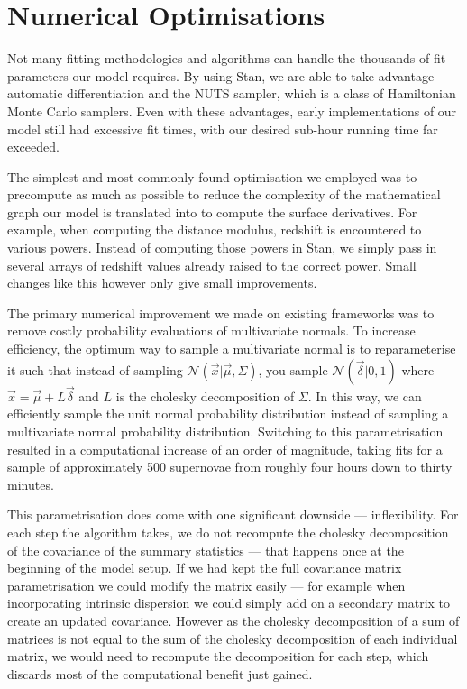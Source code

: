 \documentclass[a4paper,fleqn,usenatbib]{mnras}
\begin{document}
\section{Numerical Optimisations}
\label{app:optimisations}


Not many fitting methodologies and algorithms can handle the thousands of fit parameters our model requires. By using Stan, we are able to take advantage automatic differentiation and the NUTS sampler, which is a class of Hamiltonian Monte Carlo samplers. Even with these advantages, early implementations of our model still had excessive fit times, with our desired sub-hour running time far exceeded. 

The simplest and most commonly found optimisation we employed was to precompute as much as possible to reduce the complexity of the mathematical graph our model is translated into to compute the surface derivatives. For example, when computing the distance modulus, redshift is encountered to various powers. Instead of computing those powers in Stan, we simply pass in several arrays of redshift values already raised to the correct power. Small changes like this however only give small improvements.

The primary numerical improvement we made on existing frameworks was to remove costly probability evaluations of multivariate normals. To increase efficiency, the optimum way to sample a multivariate normal is to reparameterise it such that instead of sampling $\mathcal{N}(\vec{x}|\vec{\mu}, \Sigma)$, you sample $\mathcal{N}(\vec{\delta}|0,1)$ where $\vec{x} = \vec{\mu} + L \vec{\delta}$ and $L$ is the cholesky decomposition of $\Sigma$. In this way, we can efficiently sample the unit normal probability distribution instead of sampling a multivariate normal probability distribution. Switching to this parametrisation resulted in a computational increase of an order of magnitude, taking fits for a sample of approximately 500 supernovae from roughly four hours down to thirty minutes. 

This parametrisation does come with one significant downside --- inflexibility. For each step the algorithm takes, we do not recompute the cholesky decomposition of the covariance of the summary statistics --- that happens once at the beginning of the model setup. If we had kept the full covariance matrix parametrisation we could modify the matrix easily --- for example when incorporating intrinsic dispersion we could simply add on a secondary matrix to create an updated covariance. However as the cholesky decomposition of a sum of matrices is not equal to the sum of the cholesky decomposition of each individual matrix, we would need to recompute the decomposition for each step, which discards most of the computational benefit just gained.
\end{document}
